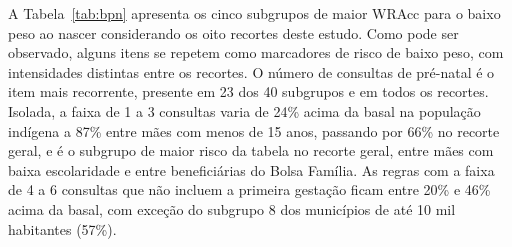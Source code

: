A Tabela~\ref{tab:bpn} apresenta os cinco subgrupos de maior WRAcc para o baixo peso ao nascer considerando os oito recortes deste estudo.
Como pode ser observado, alguns itens se repetem como marcadores de risco de baixo peso, com intensidades distintas entre os recortes. O número de consultas de pré-natal é o item mais recorrente, presente em 23 dos 40 subgrupos e em todos os recortes. Isolada, a faixa de 1 a 3 consultas varia de 24\% acima da basal na população indígena a 87\% entre mães com menos de 15 anos, passando por 66\% no recorte geral, e é o subgrupo de maior risco da tabela no recorte geral, entre mães com baixa escolaridade e entre beneficiárias do Bolsa Família. As regras com a faixa de 4 a 6 consultas que não incluem a primeira gestação ficam entre 20\% e 46\% acima da basal, com exceção do subgrupo 8 dos municípios de até 10 mil habitantes (57\%).
 

